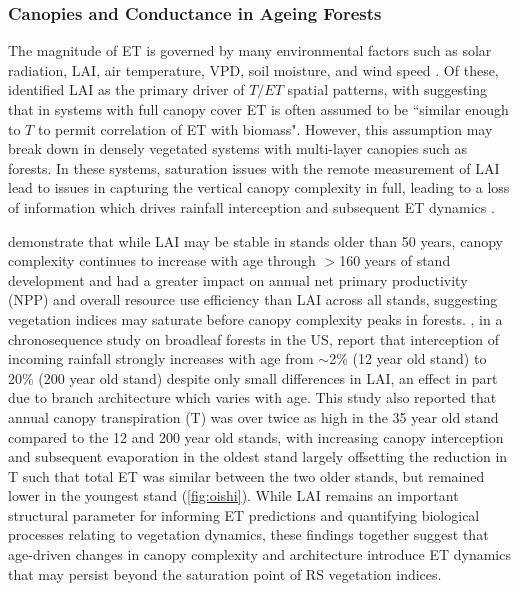 \subsubsection{Canopies and Conductance in Ageing Forests}
The magnitude of ET is governed by many environmental factors such as solar radiation, \ac{LAI}, air temperature, \ac{VPD}, soil moisture, and wind speed \parencite{yang2023evapotranspiration}. Of these, \textcite{lian2018partitioning} identified LAI as the primary driver of $T/ET$ spatial patterns, with \textcite{kool2014review} suggesting that in systems with full canopy cover ET is often assumed to be ``similar enough to $T$ to permit correlation of ET with biomass". However, this assumption may break down in densely vegetated systems with multi-layer canopies such as forests. In these systems, saturation issues with the remote measurement of LAI lead to issues in capturing the vertical canopy complexity in full, leading to a loss of information which drives rainfall interception and subsequent ET dynamics \parencite{wang2022combining}.
\par \textcite{hardiman2013maintaining} demonstrate that while LAI may be stable in stands older than 50 years, canopy complexity continues to increase with age through $>$160 years of stand development and had a greater impact on annual net primary productivity (NPP) and overall resource use efficiency than LAI across all stands, suggesting vegetation indices may saturate before canopy complexity peaks in forests. \textcite{oishi2020}, in a chronosequence study on broadleaf forests in the US, report that interception of incoming rainfall strongly increases with age from $\sim$2\% (12 year old stand) to 20\% (200 year old stand) despite only small differences in LAI, an effect in part due to branch architecture which varies with age. This study also reported that annual canopy transpiration (T) was over twice as high in the 35 year old stand compared to the 12 and 200 year old stands, with increasing canopy interception and subsequent evaporation in the oldest stand largely offsetting the reduction in T such that total ET was similar between the two older stands, but remained lower in the youngest stand (\autoref{fig:oishi}). While LAI remains an important structural parameter for informing ET predictions and quantifying biological processes relating to vegetation dynamics, these findings together suggest that age-driven changes in canopy complexity and architecture introduce ET dynamics that may persist beyond the saturation point of RS vegetation indices.
